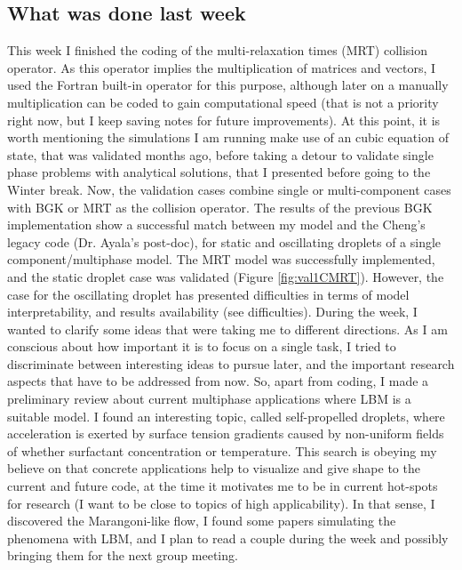\documentclass[12pt]{article}
\begin{document}
	\subsection*{What was done last week}
	This week I finished the coding of the multi-relaxation times (MRT) collision operator. As this operator implies the multiplication of matrices and vectors, I used the Fortran built-in operator for this purpose, although later on a manually multiplication can be coded to gain computational speed (that is not a priority right now, but I keep saving notes for future improvements). At this point, it is worth mentioning the simulations I am running make use of an cubic equation of state, that was validated months ago, before taking a detour to validate single phase problems with analytical solutions, that I presented before going to the Winter break. Now, the validation cases combine single or multi-component cases with BGK or MRT as the collision operator. The results of the previous BGK implementation show a successful match between my model and the Cheng's legacy code (Dr. Ayala's post-doc), for static and oscillating droplets of a single component/multiphase model. The MRT model was successfully implemented, and the static droplet case was validated (Figure \ref{fig:val1CMRT}). However, the case for the oscillating droplet has presented difficulties in terms of model interpretability, and results availability (see difficulties). During the week, I wanted to clarify some ideas that were taking me to different directions. As I am conscious about how important it is to focus on a single task, I tried to discriminate between interesting ideas to pursue later, and the important research aspects that have to be addressed from now. So, apart from coding, I made a preliminary review about current multiphase applications where LBM is a suitable model. I found an interesting topic, called self-propelled droplets, where acceleration is exerted by surface tension gradients caused by non-uniform fields of whether surfactant concentration or temperature. This search is obeying my believe on that concrete applications help to visualize and give shape to the current and future code, at the time it motivates me to be in current hot-spots for research (I want to be close to topics of high applicability). In that sense, I discovered the Marangoni-like flow, I found some papers simulating the phenomena with LBM, and I plan to read a couple during the week and possibly bringing them for the next group meeting.  
	
\end{document}
